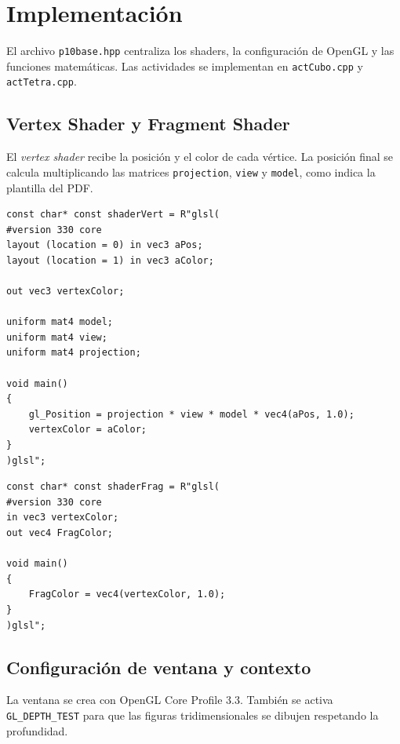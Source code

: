 \documentclass[12pt,a4paper]{article}
\begin{document}
\section*{Implementaci\'on}
El archivo \texttt{p10base.hpp} centraliza los shaders, la configuraci\'on de OpenGL y las funciones matem\'aticas. Las actividades se implementan en \texttt{actCubo.cpp} y \texttt{actTetra.cpp}.

\subsection*{Vertex Shader y Fragment Shader}
El \textit{vertex shader} recibe la posici\'on y el color de cada v\'ertice. La posici\'on final se calcula multiplicando las matrices \texttt{projection}, \texttt{view} y \texttt{model}, como indica la plantilla del PDF.

\begin{lstlisting}[style=cxx,caption={Vertex shader usado en la practica.}]
const char* const shaderVert = R"glsl(
#version 330 core
layout (location = 0) in vec3 aPos;
layout (location = 1) in vec3 aColor;

out vec3 vertexColor;

uniform mat4 model;
uniform mat4 view;
uniform mat4 projection;

void main()
{
    gl_Position = projection * view * model * vec4(aPos, 1.0);
    vertexColor = aColor;
}
)glsl";
\end{lstlisting}

\begin{lstlisting}[style=cxx,caption={Fragment shader usado para colorear cada cara.}]
const char* const shaderFrag = R"glsl(
#version 330 core
in vec3 vertexColor;
out vec4 FragColor;

void main()
{
    FragColor = vec4(vertexColor, 1.0);
}
)glsl";
\end{lstlisting}

\subsection*{Configuraci\'on de ventana y contexto}
La ventana se crea con OpenGL Core Profile 3.3. Tambi\'en se activa \texttt{GL\_DEPTH\_TEST} para que las figuras tridimensionales se dibujen respetando la profundidad.
\end{document}
